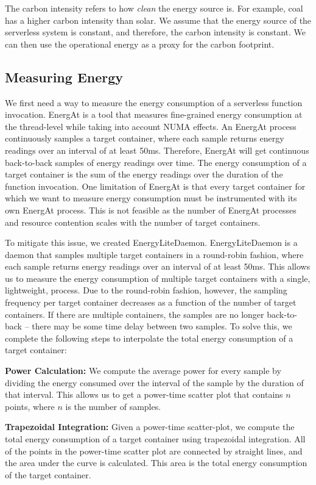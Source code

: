 \documentclass[times, 10pt,twocolumn]{article}
\begin{document}
The carbon intensity refers to how \textit{clean} the energy source is. For example, coal has a higher carbon intensity than solar. We assume that the energy source of the serverless system is constant, and therefore, the carbon intensity is constant. We can then use the operational energy as a proxy for the carbon footprint.

\subsection{Measuring Energy}
We first need a way to measure the energy consumption of a serverless function invocation. EnergAt \cite{he2023hotcarbon} is a tool that measures fine-grained energy consumption at the thread-level while taking into account NUMA effects. An EnergAt process continuously samples a target container, where each sample returns energy readings over an interval of at least 50ms. Therefore, EnergAt will get continuous back-to-back samples of energy readings over time. The energy consumption of a target container is the sum of the energy readings over the duration of the function invocation. One limitation of EnergAt is that every target container for which we want to measure energy consumption must be instrumented with its own EnergAt process. This is not feasible as the number of EnergAt processes and resource contention scales with the number of target containers.

To mitigate this issue, we created EnergyLiteDaemon. EnergyLiteDaemon is a daemon that samples multiple target containers in a round-robin fashion, where each sample returns energy readings over an interval of at least 50ms. This allows us to measure the energy consumption of multiple target containers with a single, lightweight, process. Due to the round-robin fashion, however, the sampling frequency per target container decreases as a function of the number of target containers. If there are multiple containers, the samples are no longer back-to-back -- there may be some time delay between two samples. To solve this, we complete the following steps to interpolate the total energy consumption of a target container:

\textbf{Power Calculation:} We compute the average power for every sample by dividing the energy consumed over the interval of the sample by the duration of that interval. This allows us to get a power-time scatter plot that contains $n$ points, where $n$ is the number of samples.

\textbf{Trapezoidal Integration:} Given a power-time scatter-plot, we compute the total energy consumption of a target container using trapezoidal integration. All of the points in the power-time scatter plot are connected by straight lines, and the area under the curve is calculated. This area is the total energy consumption of the target container. 
\end{document}
